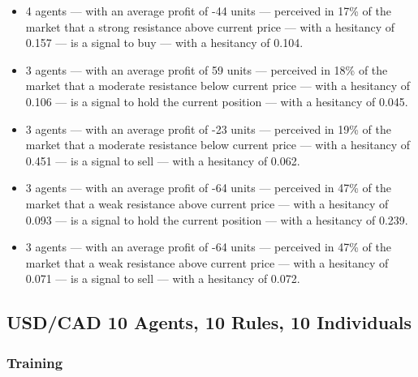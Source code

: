 {\small
  \begin{itemize}
  \item 4 agents — with an average profit of -44 units — perceived in 17\% of
    the market that a strong resistance above current price — with a hesitancy
    of 0.157 — is a signal to buy — with a hesitancy of 0.104.
  \item 3 agents — with an average profit of 59 units — perceived in 18\% of the
    market that a moderate resistance below current price — with a hesitancy of
    0.106 — is a signal to hold the current position — with a hesitancy of 0.045.
  \item 3 agents — with an average profit of -23 units — perceived in 19\% of the
    market that a moderate resistance below current price — with a hesitancy of
    0.451 — is a signal to sell — with a hesitancy of 0.062.
  \item 3 agents — with an average profit of -64 units — perceived in 47\% of the
    market that a weak resistance above current price — with a hesitancy of 0.093
    — is a signal to hold the current position — with a hesitancy of 0.239.
  \item 3 agents — with an average profit of -64 units — perceived in 47\% of the
    market that a weak resistance above current price — with a hesitancy of 0.071
    — is a signal to sell — with a hesitancy of 0.072.
  \end{itemize}
}

\subsection{USD/CAD 10 Agents, 10 Rules, 10 Individuals}
\label{results:interpretation-usd-cad-10agents-10rules-10individuals}

\subsubsection{Training}

